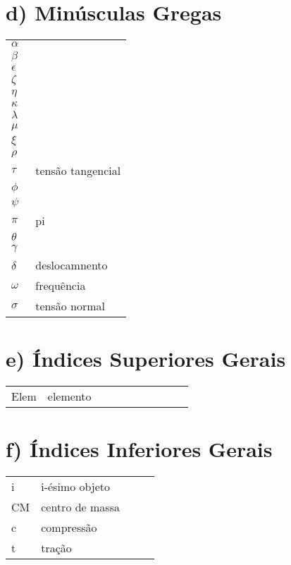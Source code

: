 \section*{d) Minúsculas Gregas}
    \begin{flushleft}
        \begin{tabular}{l p{0.8\linewidth}}
        $\alpha$   & \\
        $\beta$    & \\
        $\epsilon$ & \\
        $\zeta$    & \\
        $\eta$     & \\
        $\kappa$   & \\
        $\lambda$  & \\
        $\mu$      & \\
        $\xi$      & \\
        $\rho$     & \\
        $\tau$     & tensão tangencial\\
        $\phi$     & \\
        $\psi$     & \\
        $\pi$      & pi\\
        $\theta$   & \\
        $\gamma$   & \\
        $\delta$   & deslocamnento\\
        $\omega$   & frequência\\
        $\sigma$   & tensão normal
        \end{tabular}
    \end{flushleft}
    
\section*{e) Índices Superiores Gerais}
    \begin{flushleft}
        \begin{tabular}{l p{0.8\linewidth}}
        Elem      & elemento
        \end{tabular}
    \end{flushleft}
    
\section*{f) Índices Inferiores Gerais}
    \begin{flushleft}
        \begin{tabular}{l p{0.8\linewidth}}
        i     & i-ésimo objeto\\
        CM    & centro de massa\\
        c     & compressão\\
        t     & tração
        \end{tabular}
    \end{flushleft}
    
